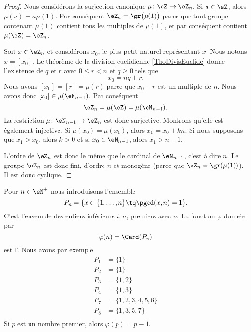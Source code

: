 \begin{proof}
    Nous considérons la surjection canonique \( \mu\colon \eZ\to \eZ_n\). Si \( a\in\eZ\), alors \( \mu(a)=a\mu(1)\). Par conséquent \( \eZ_n=\gr\big( \mu(1) \big)\) parce que tout groupe contenant \( \mu(1)\) contient tous les multiples de \( \mu(1)\), et par conséquent contient \( \mu(\eZ)=\eZ_n\).

    Soit \( x\in\eZ_n\) et considérons \( x_0\), le plus petit naturel représentant \( x\). Nous notons \( x=[x_0]\). Le théorème de la division euclidienne \ref{ThoDivisEuclide} donne l'existence de \( q\) et \( r\) avec \( 0\leq r<n\) et \( q\geq 0\) tels que
    \begin{equation}
        x_0=nq+r.
    \end{equation}
    Nous avons \( [x_0]=[r]=\mu(r)\) parce que \( x_0-r\) est un multiple de \( n\). Nous avons donc \( [x_0]\in\mu(\eN_{n-1})\). Par conséquent
    \begin{equation}
        \eZ_n=\mu(\eZ)=\mu(\eN_{n-1}).
    \end{equation}
    La restriction \( \mu\colon \eN_{n-1}\to \eZ_n\) est donc surjective. Montrons qu'elle est également injective. Si \( \mu(x_0)=\mu(x_1)\), alors \( x_1=x_0+kn\). Si nous supposons que \( x_1>x_0\), alors \( k>0\) et si \( x_0\in\eN_{n-1}\), alors \( x_1>n-1\).

    L'ordre de \( \eZ_n\) est donc le même que le cardinal de \( \eN_{n-1}\), c'est à dire \( n\). Le groupe \( \eZ_n\) est donc fini, d'ordre \( n\) et monogène (parce que \( \eZ_n=\gr(\mu(1))\)). Il est donc cyclique.
\end{proof}
 
Pour \( n\in\eN^+\) nous introduisons l'ensemble
\begin{equation}    \label{EqDefPnEntierldeost}
    P_n=\{ x\in\{ 1,\ldots,n \}\tq\pgcd(x,n)=1 \}.
\end{equation}
C'est l'ensemble des entiers inférieurs à \( n\), premiers avec \( n\). La fonction \( \varphi\) donnée par
\begin{equation}    \label{EqEulerGqPsvi}
    \varphi(n)=\Card(P_n)
\end{equation}
est l'. Nous avons par exemple
\begin{subequations}
    \begin{align}
        P_1&=\{ 1 \}\\
        P_2&=\{ 1 \}\\
        P_3&=\{ 1,2 \}\\
        P_4&=\{ 1,3 \}\\
        P_7&=\{ 1,2,3,4,5,6 \}\\
        P_8&=\{ 1,3,5,7 \}\\
    \end{align}
\end{subequations}
Si \( p\) est un nombre premier, alors \( \varphi(p)=p-1\).

